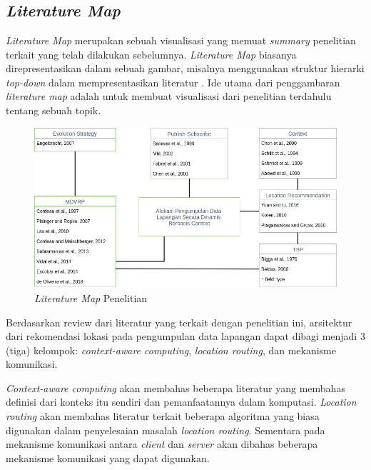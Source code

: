 \chapter{\babDua}


\section{\textit{Literature Map}}
\label{sec:literature-map}
\textit{Literature Map} merupakan sebuah visualisasi yang memuat \textit{summary} penelitian terkait yang telah dilakukan sebelumnya. \textit{Literature Map} biasanya direpresentasikan dalam sebuah gambar, misalnya menggunakan struktur hierarki \textit{top-down} dalam mempresentasikan literatur \citep{creswell_research_2013}. Ide utama dari penggambaran \textit{literature map} adalah untuk membuat visualisasi dari penelitian terdahulu tentang sebuah topik.


\begin{figure}[!]
	\centering
	\includegraphics[width=\textwidth]{Resources/Images/literature-map}
	\caption{\textit{Literature Map} Penelitian}
	\label{fig:literature-map}
\end{figure}


Berdasarkan review dari literatur yang terkait dengan penelitian ini, arsitektur dari rekomendasi lokasi pada pengumpulan data lapangan dapat dibagi menjadi 3 (tiga) kelompok: \textit{context-aware computing}, \textit{location routing}, dan mekanisme komunikasi.


\textit{Context-aware computing} akan membahas beberapa literatur yang membahas definisi dari konteks itu sendiri dan pemanfaatannya dalam komputasi. \textit{Location routing} akan membahas literatur terkait beberapa algoritma yang biasa digunakan dalam penyelesaian masalah \textit{location routing}. Sementara pada mekanisme komunikasi antara \textit{client} dan \textit{server} akan dibahas beberapa mekanisme komunikasi yang dapat digunakan.


